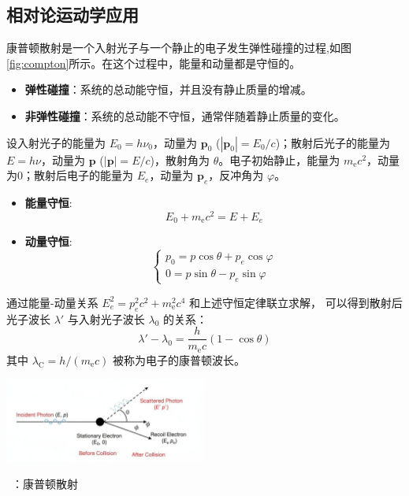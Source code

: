 \documentclass[fontset=none]{ctexart}
\begin{document}
\subsection{相对论运动学应用}
\begin{example}[康普顿散射]
康普顿散射是一个入射光子与一个静止的电子发生弹性碰撞的过程,如图\ref{fig:compton}所示。在这个过程中，能量和动量都是守恒的。
\begin{itemize}
    \item \textbf{弹性碰撞}：系统的总动能守恒，并且没有静止质量的增减。
    \item \textbf{非弹性碰撞}：系统的总动能不守恒，通常伴随着静止质量的变化。
\end{itemize}
设入射光子的能量为 $E_0 = h\nu_0$，动量为 $\bm{p}_0$ ($|\bm{p}_0| = E_0/c$)；散射后光子的能量为 $E = h\nu$，动量为 $\bm{p}$ ($|\bm{p}| = E/c$)，散射角为 $\theta$。电子初始静止，能量为 $m_{\mathrm{e}}c^2$，动量为0；散射后电子的能量为 $E_e$，动量为 $\bm{p}_e$，反冲角为 $\varphi$。
\begin{itemize}
    \item \textbf{能量守恒}:
    \begin{equation}
    E_0 + m_{\mathrm{e}}c^2 = E + E_e
    \end{equation}
    \item \textbf{动量守恒}:
    \begin{equation}
    \begin{cases}
    p_0 = p\cos\theta + p_e\cos\varphi \\
    0 = p\sin\theta - p_e\sin\varphi
    \end{cases}
    \end{equation}
\end{itemize}
通过能量-动量关系 $E_e^2 = p_e^2c^2 + m_{\mathrm{e}}^2c^4$ 和上述守恒定律联立求解，
可以得到散射后光子波长 $\lambda'$ 与入射光子波长 $\lambda_0$ 的关系：
\begin{equation}
\lambda' - \lambda_0 = \frac{h}{m_{\mathrm{e}}c}(1 - \cos\theta)
\end{equation}
其中 $\lambda_{\mathrm{C}} = h/(m_{\mathrm{e}}c)$ 被称为电子的康普顿波长。

\noindent\begin{minipage}{\linewidth}
    \centering
    \includegraphics[width=0.5\textwidth]{imgs/ComptonScattering.pdf}
    \label{fig:compton}
    \par\small \figurename~\thefigure：康普顿散射
\end{minipage}

\end{example}
\end{document}
